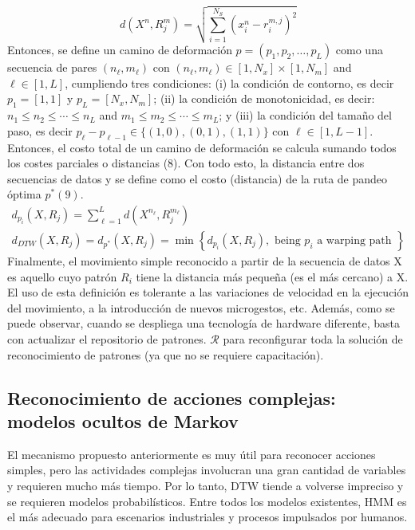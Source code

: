\documentclass[10pt]{article}
\begin{document}
$$
d\left(X^{n}, R_{j}^{m}\right)=\sqrt{\sum_{i=1}^{N_{S}}\left(x_{i}^{n}-r_{i}^{m, j}\right)^{2}}
$$
Entonces, se define un camino de deformación $p=\left(p_{1}, p_{2}, \ldots, p_{L}\right)$ como una secuencia de pares $\left(n_{\ell}, m_{\ell}\right)$ con $\left(n_{\ell}, m_{\ell}\right) \in\left[1, N_{x}\right] \times\left[1, N_{m}\right]$ and $\ell \in[1, L]$, cumpliendo tres condiciones: (i) la condición de contorno, es decir $p_{1}=[1,1]$ y $p_{L}=\left[N_{x}, N_{m}\right]$; (ii) la condición de monotonicidad, es decir: $n_{1} \leq n_{2} \leq \cdots \leq n_{L}$ and $m_{1} \leq m_{2} \leq \cdots \leq m_{L}$; y (iii) la condición del tamaño del paso, es decir  $p_{\ell}-p_{\ell-1} \in\{(1,0),(0,1),(1,1)\}$ con $\ell \in[1, L-1]$.
Entonces, el costo total de un camino de deformación    se calcula sumando todos los costes parciales o distancias (8). Con todo esto, la distancia entre dos secuencias de datos y se define como el costo (distancia) de la ruta de pandeo óptima $p^{*}(9)$.
$$
\begin{gathered}
d_{p_{i}}\left(X, R_{j}\right)=\sum_{\ell=1}^{L} d\left(X^{n_{\ell}}, R_{j}^{m_{\ell}}\right) \\
d_{D T W}\left(X, R_{j}\right)=d_{p^{*}}\left(X, R_{j}\right)=\min \left\{d_{p_{i}}\left(X, R_{j}\right), \text { being } p_{i} \text { a warping path }\right\}
\end{gathered}
$$
Finalmente, el movimiento simple reconocido a partir de la secuencia de datos X es aquello cuyo patrón $R_{i}$  tiene la distancia más pequeña (es el más cercano) a X.
El uso de esta definición es tolerante a las variaciones de velocidad en la ejecución del movimiento, a la introducción de nuevos microgestos, etc. Además, como se puede observar, cuando se despliega una tecnología de hardware diferente, basta con actualizar el repositorio de patrones. $\mathcal{R}$ para reconfigurar toda la solución de reconocimiento de patrones (ya que no se requiere capacitación). 



\subsection{Reconocimiento de acciones complejas: modelos ocultos de Markov}
El mecanismo propuesto anteriormente es muy útil para reconocer acciones simples, pero las actividades complejas involucran una gran cantidad de variables y requieren mucho más tiempo. Por lo tanto, DTW tiende a volverse impreciso y se requieren modelos probabilísticos. Entre todos los modelos existentes, HMM es el más adecuado para escenarios industriales y procesos impulsados por humanos.
\end{document}
